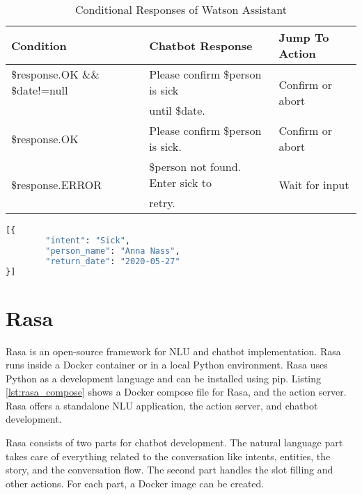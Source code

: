\begin{table}[H]
    \centering
    \begin{tabular}{ l | l | l  }
  Condition & Chatbot Response & Jump To Action \\ \hline \hline
  \$response.OK \&\& \$date!=null & Please confirm \$person is sick & \multirow{2}{*}{Confirm or abort} \\
        & until \$date. & \\ \hline
  \$response.OK & Please confirm \$person is sick. & Confirm or abort \\ \hline
  \multirow{2}{*}{\$response.ERROR} & \$person not found. Enter sick to & \multirow{2}{*}{Wait for input} \\ 
  &  retry. & \\ \hline

\end{tabular}
    \caption{Conditional Responses of Watson Assistant} \label{tab:watson_cond_response}
\end{table} \noindent


\begin{lstlisting}[caption={Watson Assistant Request Format}, label={lst:watson_request},captionpos=b,frame=single,language={Python},commentstyle=\color{mygreen},keywordstyle=\color{blue},
    morekeywords={}]                
[{
        "intent": "Sick",
        "person_name": "Anna Nass",
        "return_date": "2020-05-27"
}]
\end{lstlisting}  


\section{Rasa}
Rasa\cite{rasa} is an open-source framework for NLU and chatbot implementation.
Rasa runs inside a Docker container or in a local Python environment.
Rasa uses Python as a development language and can be installed using pip.
Listing \ref{lst:rasa_compose} shows a Docker compose file for Rasa, and the action server. 
Rasa offers a standalone NLU application, the action server, and chatbot development.

Rasa consists of two parts for chatbot development.
The natural language part takes care of everything related to 
the conversation like intents, entities, the story, and the conversation flow.
The second part handles the slot filling and other actions.
For each part, a Docker image can be created.

